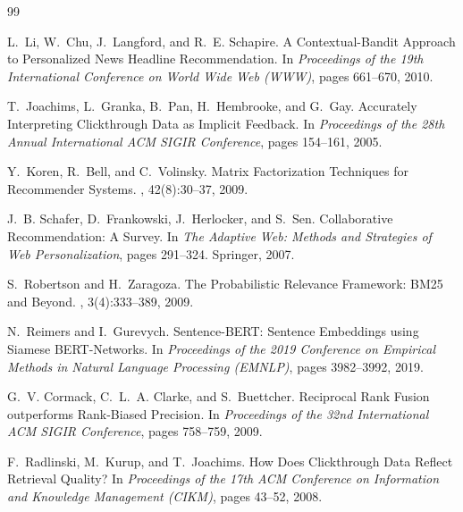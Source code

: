 \documentclass[11pt,a4paper]{article}
\begin{document}
\begin{thebibliography}{99}
\small

L.~Li, W.~Chu, J.~Langford, and R.~E. Schapire.
\newblock A Contextual-Bandit Approach to Personalized News Headline Recommendation.
\newblock In {\em Proceedings of the 19th International Conference on World Wide Web (WWW)}, pages 661--670, 2010.

T.~Joachims, L.~Granka, B.~Pan, H.~Hembrooke, and G.~Gay.
\newblock Accurately Interpreting Clickthrough Data as Implicit Feedback.
\newblock In {\em Proceedings of the 28th Annual International ACM SIGIR Conference}, pages 154--161, 2005.

Y.~Koren, R.~Bell, and C.~Volinsky.
\newblock Matrix Factorization Techniques for Recommender Systems.
, 42(8):30--37, 2009.

J.~B. Schafer, D.~Frankowski, J.~Herlocker, and S.~Sen.
\newblock Collaborative Recommendation: A Survey.
\newblock In {\em The Adaptive Web: Methods and Strategies of Web Personalization}, pages 291--324. Springer, 2007.

S.~Robertson and H.~Zaragoza.
\newblock The Probabilistic Relevance Framework: BM25 and Beyond.
, 3(4):333--389, 2009.

N.~Reimers and I.~Gurevych.
\newblock Sentence-BERT: Sentence Embeddings using Siamese BERT-Networks.
\newblock In {\em Proceedings of the 2019 Conference on Empirical Methods in Natural Language Processing (EMNLP)}, pages 3982--3992, 2019.

G.~V. Cormack, C.~L.~A. Clarke, and S.~Buettcher.
\newblock Reciprocal Rank Fusion outperforms Rank-Biased Precision.
\newblock In {\em Proceedings of the 32nd International ACM SIGIR Conference}, pages 758--759, 2009.

F.~Radlinski, M.~Kurup, and T.~Joachims.
\newblock How Does Clickthrough Data Reflect Retrieval Quality?
\newblock In {\em Proceedings of the 17th ACM Conference on Information and Knowledge Management (CIKM)}, pages 43--52, 2008.

\end{thebibliography}
\end{document}
